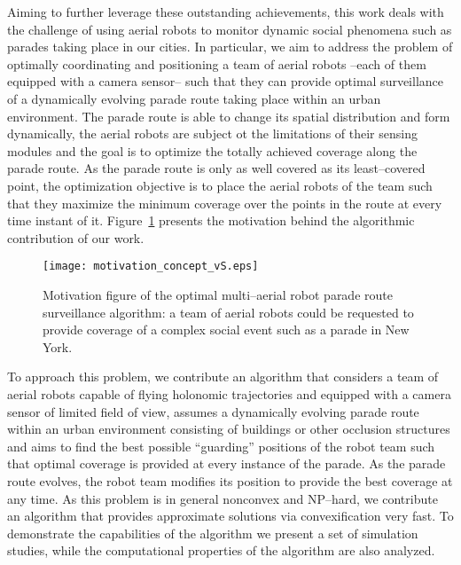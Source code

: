 \documentclass[letterpaper, 10 pt, conference]{ieeeconf}  %
\begin{document}
Aiming to further leverage these outstanding achievements, this work deals with the challenge of using aerial robots to monitor dynamic social phenomena such as parades taking place in our cities. In particular, we aim to address the problem of optimally coordinating and positioning a team of aerial robots --each of them equipped with a camera sensor-- such that they can provide optimal surveillance of a dynamically evolving parade route taking place within an urban environment. The parade route is able to change its spatial distribution and form dynamically, the aerial robots are subject ot the limitations of their sensing modules and the goal is to optimize the totally achieved coverage along the parade route. As the parade route is only as well covered as its least--covered point, the optimization objective is to place the aerial robots of the team such that they maximize the minimum coverage over the points in the route at every time instant of it. Figure~\ref{fig:motivation} presents the motivation behind the algorithmic contribution of our work.

%
\begin{figure}[h!]
\centering
  \texttt{[image: motivation\_concept\_vS.eps]}
\caption{Motivation figure of the optimal multi--aerial robot parade route surveillance algorithm: a team of aerial robots could be requested to provide coverage of a complex social event such as a parade in New York. }
\label{fig:motivation}
\end{figure}
%

To approach this problem, we contribute an algorithm that considers a team of aerial robots capable of flying holonomic trajectories and equipped with a camera sensor of limited field of view, assumes a dynamically evolving parade route within an urban environment consisting of buildings or other occlusion structures and aims to find the best possible ``guarding'' positions of the robot team such that optimal coverage is provided at every instance of the parade. As the parade route evolves, the robot team modifies its position to provide the best coverage at any time. As this problem is in general nonconvex and NP--hard, we contribute an algorithm that provides approximate solutions via convexification very fast. To demonstrate the capabilities of the algorithm we present a set of simulation studies, while the computational properties of the algorithm are also analyzed. 
\end{document}
